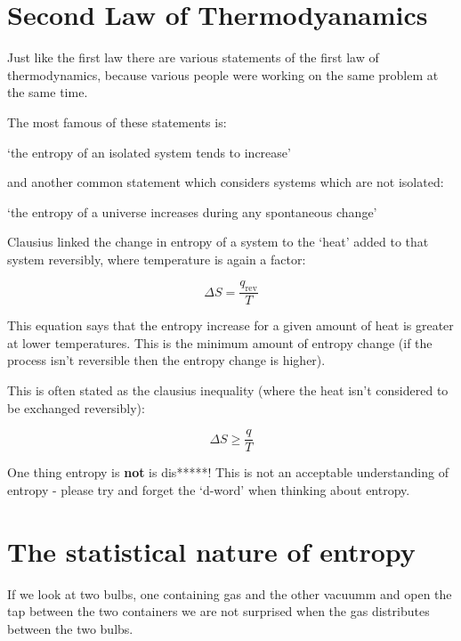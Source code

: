 \documentclass[
]{book}
\begin{document}
\hypertarget{second-law-of-thermodyanamics}{%
\section{Second Law of Thermodyanamics}\label{second-law-of-thermodyanamics}}

Just like the first law there are various statements of the first law of thermodynamics, because various people were working on the same problem at the same time.

The most famous of these statements is:

`the entropy of an isolated system tends to increase'

and another common statement which considers systems which are not isolated:

`the entropy of a universe increases during any spontaneous change'

Clausius linked the change in entropy of a system to the `heat' added to that system reversibly, where temperature is again a factor:

\begin{equation}
\Delta S=\frac{q_{\textrm{rev}}}{T}
\label{eq:clausius}
\end{equation}

This equation says that the entropy increase for a given amount of heat is greater at lower temperatures. This is the minimum amount of entropy change (if the process isn't reversible then the entropy change is higher).

This is often stated as the clausius inequality (where the heat isn't considered to be exchanged reversibly):

\begin{equation}
\Delta S \geq \frac {q}{T}
\label{eq:clausiusineq}
\end{equation}

One thing entropy is \textbf{not} is dis*****! This is not an acceptable understanding of entropy - please try and forget the `d-word' when thinking about entropy.

\hypertarget{the-statistical-nature-of-entropy}{%
\section{The statistical nature of entropy}\label{the-statistical-nature-of-entropy}}

If we look at two bulbs, one containing gas and the other vacuumm and open the tap between the two containers we are not surprised when the gas distributes between the two bulbs.
\end{document}
